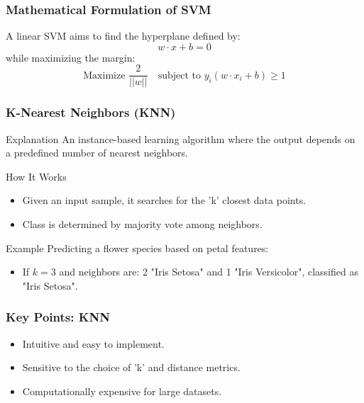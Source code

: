 \documentclass{beamer}
\begin{document}
\begin{frame}[fragile]
    \frametitle{Mathematical Formulation of SVM}
    A linear SVM aims to find the hyperplane defined by:
    \begin{equation}
        w \cdot x + b = 0
    \end{equation}
    while maximizing the margin:
    \begin{equation}
        \text{Maximize } \frac{2}{||w||} \quad \text{subject to } y_i (w \cdot x_i + b) \geq 1
    \end{equation}
\end{frame}

\begin{frame}[fragile]
    \frametitle{K-Nearest Neighbors (KNN)}
    \begin{block}{Explanation}
        An instance-based learning algorithm where the output depends on a predefined number of nearest neighbors.
    \end{block}
    
    \begin{block}{How It Works}
        \begin{itemize}
            \item Given an input sample, it searches for the 'k' closest data points.
            \item Class is determined by majority vote among neighbors.
        \end{itemize}
    \end{block}

    \begin{block}{Example}
        Predicting a flower species based on petal features:
        \begin{itemize}
            \item If \(k=3\) and neighbors are: 2 "Iris Setosa" and 1 "Iris Versicolor", classified as "Iris Setosa".
        \end{itemize}
    \end{block}
\end{frame}

\begin{frame}[fragile]
    \frametitle{Key Points: KNN}
    \begin{itemize}
        \item Intuitive and easy to implement.
        \item Sensitive to the choice of 'k' and distance metrics.
        \item Computationally expensive for large datasets.
    \end{itemize}
\end{frame}
\end{document}
